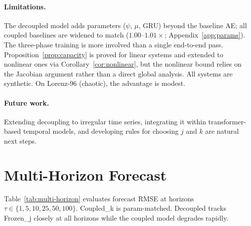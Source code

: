 \documentclass{article}
\begin{document}
\paragraph{Limitations.}
The decoupled model adds parameters ($\psi$, $\mu$, GRU) beyond the
baseline AE; all coupled baselines are widened to match
($1.00$--$1.01\times$; Appendix~\ref{app:params}).  The three-phase
training is more involved than a single end-to-end pass.
Proposition~\ref{prop:capacity} is proved for linear systems and
extended to nonlinear ones via Corollary~\ref{cor:nonlinear}, but
the nonlinear bound relies on the Jacobian argument rather than a
direct global analysis.
All systems are synthetic.  On Lorenz-96 (chaotic), the advantage
is modest.

\paragraph{Future work.}
Extending decoupling to irregular time series, integrating it within
transformer-based temporal models, and developing rules for choosing
$j$ and $k$ are natural next steps.






\appendix

\section{Multi-Horizon Forecast}
\label{app:multi-horizon}

Table~\ref{tab:multi-horizon} evaluates forecast RMSE at horizons
$\tau \in \{1, 5, 10, 25, 50, 100\}$.  Coupled\_k is param-matched.
Decoupled tracks Frozen\_j closely at all horizons while the coupled
model degrades rapidly.
\end{document}
